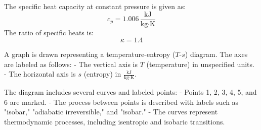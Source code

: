 The specific heat capacity at constant pressure is given as:  
\[
c_{p} = 1.006 \, \frac{\text{kJ}}{\text{kg·K}}
\]  
The ratio of specific heats is:  
\[
\kappa = 1.4
\]  

A graph is drawn representing a temperature-entropy (\(T\)-\(s\)) diagram. The axes are labeled as follows:  
- The vertical axis is \(T\) (temperature) in unspecified units.  
- The horizontal axis is \(s\) (entropy) in \(\frac{\text{kJ}}{\text{kg·K}}\).  

The diagram includes several curves and labeled points:  
- Points 1, 2, 3, 4, 5, and 6 are marked.  
- The process between points is described with labels such as "isobar," "adiabatic irreversible," and "isobar."  
- The curves represent thermodynamic processes, including isentropic and isobaric transitions.